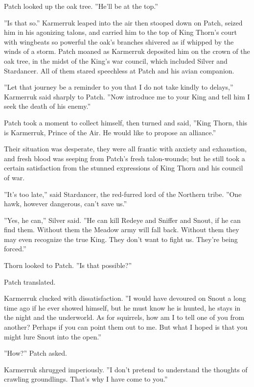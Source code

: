 \documentclass[12pt]{book}
\begin{document}
 Patch looked up the oak tree. ''He'll be at the top.''\par
 ''Is that so.'' Karmerruk leaped into the air %
 then stooped down on Patch, seized him in his agonizing talons, and carried him to the top of King Thorn's court with wingbeats so powerful the oak's branches shivered as if whipped by the winds of a storm. Patch moaned as Karmerruk deposited him on the crown of the oak tree, in the midst of the King's war council, which included Silver and Stardancer. All of them stared speechless at Patch and his avian companion.\par
 ''Let that journey be a reminder to you that I do not take kindly to delays,'' Karmerruk said sharply to Patch. ''Now introduce me to your King and tell him I seek the death of his enemy.''\par
 Patch took a moment to collect himself, then turned and said, ''King Thorn, this is Karmerruk, Prince of the Air. He would like to propose an alliance.''\par
 Their situation was desperate, they were all frantic with anxiety and exhaustion, and fresh blood was seeping from Patch's fresh talon-wounds; but he still took a certain satisfaction from the stunned expressions of King Thorn and his council of war.\par
 ''It's too late,'' said Stardancer, the red-furred lord of the Northern tribe. ''One hawk, however dangerous, can't save us.''\par
 ''Yes, he can,'' Silver said. ''He can kill Redeye and Sniffer and Snout, if he can find them. Without them the Meadow army will fall back. Without them they may even recognize the true King. They don't want to fight us. They're being forced.''\par
 Thorn looked to Patch. ''Is that possible?''\par
 Patch translated.\par
 Karmerruk clucked with dissatisfaction. ''I would have devoured on Snout a long time ago if he ever showed himself, but he must know he is hunted, he stays in the night and the underworld. As for squirrels, how am I to tell one of you from another? Perhaps if you can point them out to me. But what I hoped is that you might lure Snout into the open.''\par
 ''How?'' Patch asked.\par
 Karmerruk shrugged imperiously. ''I don't pretend to understand the thoughts of crawling groundlings. That's why I have come to you.''\par
\end{document}
